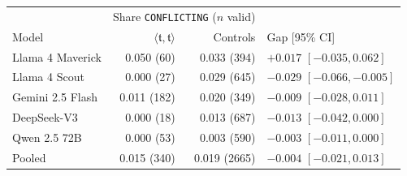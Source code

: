 \begin{tabular}{@{}l@{\qquad}r@{\quad}r@{\qquad}l@{}}
\toprule
 & \multicolumn{2}{l}{Share \texttt{CONFLICTING} ($n$ valid)} & \\
Model & $\langle\mathfrak{t},\mathfrak{t}\rangle$ & Controls & Gap [95\% CI] \\
\midrule
Llama 4 Maverick & 0.050 (60) & 0.033 (394) & $+0.017$ $[-0.035, 0.062]$ \\
Llama 4 Scout & 0.000 (27) & 0.029 (645) & $-0.029$ $[-0.066, -0.005]$ \\
Gemini 2.5 Flash & 0.011 (182) & 0.020 (349) & $-0.009$ $[-0.028, 0.011]$ \\
DeepSeek-V3 & 0.000 (18) & 0.013 (687) & $-0.013$ $[-0.042, 0.000]$ \\
Qwen 2.5 72B & 0.000 (53) & 0.003 (590) & $-0.003$ $[-0.011, 0.000]$ \\
\midrule
Pooled & 0.015 (340) & 0.019 (2665) & $-0.004$ $[-0.021, 0.013]$ \\
\bottomrule
\end{tabular}
